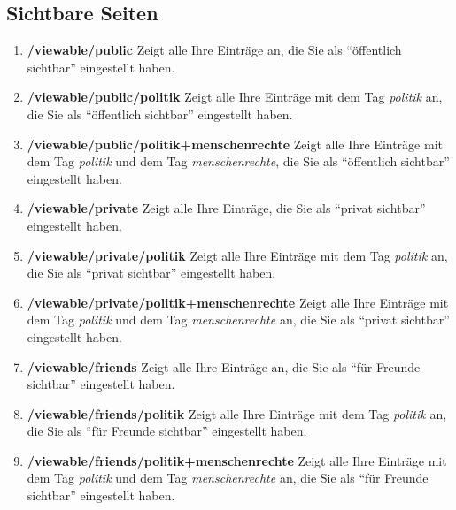 \subsection{Sichtbare Seiten}
\label{subsec:sichtbareSeiten}
\begin{enumerate}
    \item \textbf{/viewable/public} \newline
    Zeigt alle Ihre Einträge an, die Sie als \enquote{öffentlich sichtbar} eingestellt haben.
    \item \textbf{/viewable/public/politik} \newline
    Zeigt alle Ihre Einträge mit dem Tag \textit{politik} an, die Sie als \enquote{öffentlich sichtbar} eingestellt haben.
    \item \textbf{/viewable/public/politik+menschenrechte} \newline
    Zeigt alle Ihre Einträge mit dem Tag \textit{politik} und dem Tag \textit{menschenrechte}, die Sie als \enquote{öffentlich sichtbar} eingestellt haben.
    \item \textbf{/viewable/private} \newline
    Zeigt alle Ihre Einträge, die Sie als \enquote{privat sichtbar} eingestellt haben.
    \item \textbf{/viewable/private/politik} \newline
    Zeigt alle Ihre Einträge mit dem Tag \textit{politik} an, die Sie als \enquote{privat sichtbar} eingestellt haben.
    \item \textbf{/viewable/private/politik+menschenrechte} \newline
    Zeigt alle Ihre Einträge mit dem Tag \textit{politik} und dem Tag \textit{menschenrechte} an, die Sie als \enquote{privat sichtbar} eingestellt haben.
    \item \textbf{/viewable/friends} \newline
    Zeigt alle Ihre Einträge an, die Sie als \enquote{für Freunde sichtbar} eingestellt haben.
    \item \textbf{/viewable/friends/politik} \newline
    Zeigt alle Ihre Einträge mit dem Tag \textit{politik} an, die Sie als \enquote{für Freunde sichtbar} eingestellt haben.
    \item \textbf{/viewable/friends/politik+menschenrechte} \newline
    Zeigt alle Ihre Einträge mit dem Tag \textit{politik} und dem Tag \textit{menschenrechte} an, die Sie als \enquote{für Freunde sichtbar} eingestellt haben.

\end{enumerate}
